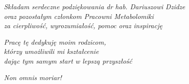\begin{flushright}
    \textit{
        Składam serdeczne podziękowania dr hab. Dariuszowi Dzidze\\
        oraz pozostałym członkom Pracowni Metabolomiki\\
        za cierpliwość, wyrozumiałość, pomoc oraz inspirację\\
    }
\end{flushright}

\begin{flushright}
    \textit{
        Pracę tę dedykuję moim rodzicom,\\
        którzy umożliwili mi kształcenie\\
        dając tym samym start w lepszą przyszłość\\
    }
\end{flushright}

\vspace{\fill}

\textit{Non omnis moriar!}